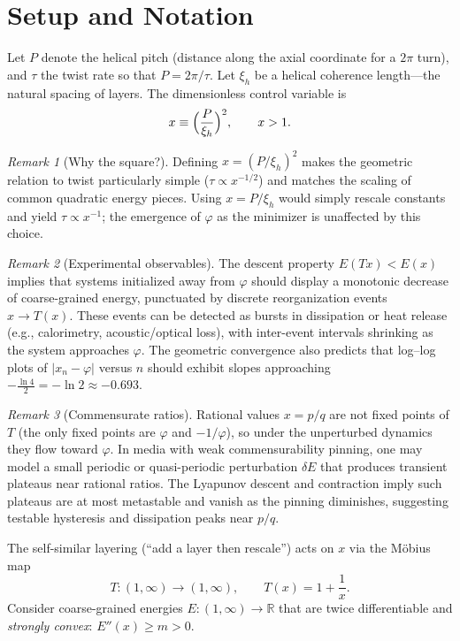 \documentclass[11pt]{article}
\theoremstyle{remark}
\newtheorem{remark}{Remark}
\theoremstyle{definition}
\newcommand{\R}{\mathbb{R}}
\newcommand{\ph}{\varphi}
\begin{document}
\section{Setup and Notation}
Let $P$ denote the helical pitch (distance along the axial coordinate for a $2\pi$ turn), and $\tau$ the twist rate so that $P=2\pi/\tau$. Let $\xi_h$ be a helical coherence length---the natural spacing of layers. The dimensionless control variable is
\begin{equation}
 x \equiv \Bigl(\frac{P}{\xi_h}\Bigr)^2, \qquad x>1.
 \label{eq:defx}
\end{equation}
\begin{remark}[Why the square?]
Defining $x=(P/\xi_h)^2$ makes the geometric relation to twist particularly simple ($\tau\propto x^{-1/2}$) and matches the scaling of common quadratic energy pieces. Using $x=P/\xi_h$ would simply rescale constants and yield $\tau\propto x^{-1}$; the emergence of $\ph$ as the minimizer is unaffected by this choice.
\end{remark}
\begin{remark}[Experimental observables]
The descent property $E(Tx)<E(x)$ implies that systems initialized away from $\varphi$ should display a monotonic decrease
of coarse-grained energy, punctuated by discrete reorganization events $x\!\to\!T(x)$. These events can be detected as
bursts in dissipation or heat release (e.g., calorimetry, acoustic/optical loss), with inter-event intervals shrinking as the system approaches $\varphi$.  The geometric convergence also predicts that log--log plots of $|x_n-\varphi|$ versus $n$ should exhibit slopes approaching $-\tfrac{\ln 4}{2}=-\ln 2\approx -0.693$.\end{remark}
\begin{remark}[Commensurate ratios]
Rational values $x=p/q$ are not fixed points of $T$ (the only fixed points are $\varphi$ and $-1/\varphi$), so under the unperturbed dynamics they flow toward $\varphi$.
In media with weak commensurability pinning, one may model a small periodic or quasi-periodic perturbation $\delta E$ that produces transient plateaus near rational ratios.
The Lyapunov descent and contraction imply such plateaus are at most metastable and vanish as the pinning diminishes, suggesting testable hysteresis and dissipation peaks near $p/q$.
\end{remark}


The self-similar layering (``add a layer then rescale'') acts on $x$ via the M\"obius map
\begin{equation}
 T:(1,\infty)\to(1,\infty),\qquad T(x)=1+\frac{1}{x}.
 \label{eq:Tmap}
\end{equation}
Consider coarse-grained energies $E:(1,\infty)\to\R$ that are twice differentiable and \emph{strongly convex}: $E''(x)\ge m>0$.
\end{document}
